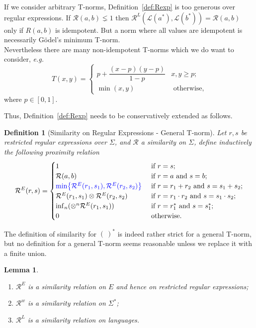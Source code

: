 \documentclass{article}
\def\eg{{\em e.g. }}
\newtheorem{definition}{Definition}[section]
\newtheorem{lemma}{Lemma}[section]
\begin{document}
If we consider arbitrary T-norms, Definition~\ref{def:Rexp} is too generous over regular expressions. If $\mathcal R(a,b)\lneq 1$ then $\mathcal R^L(\mathcal L(a^\ast),\mathcal L(b^\ast))= \mathcal R(a,b)$ only if  $R(a,b)$ is idempotent. But a norm where all values are idempotent is necessarily G\"odel's minimum T-norm. 
\\ Nevertheless there are many non-idempotent T-norms which we do want to consider, \eg\ 
$$T(x,y)=\begin{cases}p+ \dfrac{(x-p)(y-p)}{1-p} & x,y\geq p;\\ \min(x,y) & \mbox{ otherwise,}
\end{cases}$$ where $p\in [0,1]$. 

Thus, Definition~\ref{def:Rexp} needs to be conservatively extended as follows.

\begin{definition}[Similarity on Regular Expressions - General T-norm] \label{def:Rexpg}
Let $r,s$ be restricted regular expressions over $\Sigma$, and $\mathcal{R}$ a similarity on $\Sigma$, define inductively the following proximity relation
$$\mathcal{R}^E(r,s) = \begin{cases}1 & \mbox{ if } r=s; \\
                                                       \mathcal{R}(a,b)  & \mbox{ if } r=a \mbox{ and } s=b; \\
                                                      {\color{blue}\min\!{\big\{\mathcal{R}^E(r_1,s_1),  \mathcal{R}^E(r_2,s_2) \big\}}}& \mbox{ if } r=r_1+r_2 \mbox{ and } s=s_1+s_2; \\
                                                      \mathcal{R}^E(r_1,s_1) \otimes \mathcal{R}^E(r_2,s_2) & \mbox{ if } r=r_1\cdot r_2 \mbox{ and } s=s_1\cdot s_2; \\
                                                       \inf_n( \otimes^n \mathcal{R}^E(r_1,s_1) ) & \mbox{ if } r=r_1^\ast \mbox{ and } s=s_1^\ast; \\
                                                        0 & \mbox{ otherwise.}
\end{cases}$$
\end{definition}

The definition of similarity for $(\ )^\ast$ is indeed rather strict for a general T-norm, but no definition for a general T-norm seems reasonable unless we replace it with a finite union. 


\begin{lemma} \hfill \begin{enumerate}
\item $\mathcal{R}^{E}$ is a similarity  relation on $E$ and hence on restricted regular expressions;
\item $\mathcal{R}^w$ is a similarity  relation on $\Sigma^*$;
\item$\mathcal R^L$ is a similarity relation on languages.
\end{enumerate}
\end{lemma}
\end{document}
